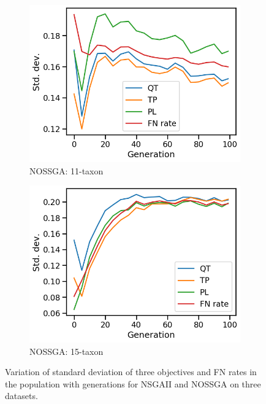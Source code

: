 \begin{figure}[!htbp]
\begin{adjustwidth}{-1cm}{-1cm}
\begin{subfigure}[b]{0.4\textwidth}
			\includegraphics[width=\textwidth]{Figure/11-taxon_NOSSGA_std_dev}
			\caption{NOSSGA: 11-taxon}
		\end{subfigure}%
		\begin{subfigure}[b]{0.4\textwidth}
			\includegraphics[width=\textwidth]{Figure/15-taxon_NOSSGA_std_dev}
			\caption{NOSSGA: 15-taxon}
		\end{subfigure}
		\caption{Variation of standard deviation of three objectives and FN rates in the population with generations for NSGAII and NOSSGA on three datasets.
		}
		\label{fig:gen_wise_std_dev}
	\end{adjustwidth}
\end{figure}

